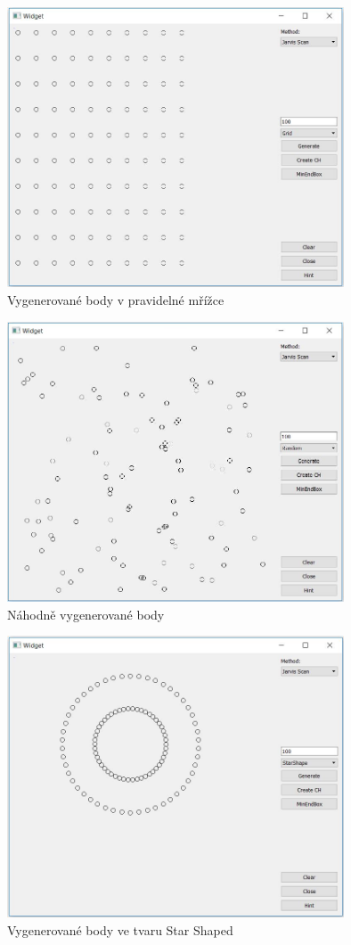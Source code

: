 \documentclass[a4paper, 12pt]{article}
\begin{document}
\begin{figure}[h!]
	\centering
	\includegraphics[width=10cm]{grid.jpg}
	\caption{Vygenerované body v pravidelné mřížce}
\end{figure}

\begin{figure}[h!]
	\centering
	\includegraphics[width=10cm]{random.jpg}
	\caption{Náhodně vygenerované body}
\end{figure}

\begin{figure}[h!]
	\centering
	\includegraphics[width=10cm]{star_shaped.jpg}
	\caption{Vygenerované body ve tvaru Star Shaped}
\end{figure}
\end{document}
